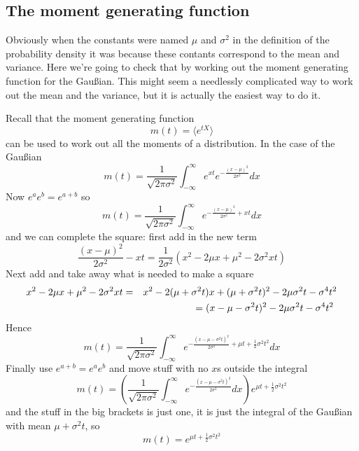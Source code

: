 \documentclass[11pt,a4paper]{scrartcl}
\begin{document}
\subsection*{The moment generating function}

Obviously when the constants were named $\mu$ and $\sigma^2$ in the
definition of the probability density it was because these contants
correspond to the mean and variance. Here we're going to check that by
working out the moment generating function for the Gau\ss{}ian. This
might seem a needlessly complicated way to work out the mean and the
variance, but it is actually the easiest way to do it.

Recall that the moment generating function 
\begin{equation}
m(t)=\langle e^{tX}\rangle
\end{equation}
can be used to work out all the moments of a distribution. In the case of the Gau\ss{}ian
\begin{equation}
m(t)=\frac{1}{\sqrt{2\pi\sigma^2}}\int_{-\infty}^\infty e^{xt}e^{-\frac{(x-\mu)^2}{2\sigma^2}}dx
\end{equation}
Now $e^ae^b=e^{a+b}$ so
\begin{equation}
m(t)=\frac{1}{\sqrt{2\pi\sigma^2}}\int_{-\infty}^\infty e^{-\frac{(x-\mu)^2}{2\sigma^2}+xt}dx
\end{equation}
and we can complete the square: first add in the new term
\begin{equation}
\frac{(x-\mu)^2}{2\sigma^2}-xt=\frac{1}{2\sigma^2}(x^2-2\mu x +\mu^2-2\sigma^2 xt)
\end{equation}
Next add and take away what is needed to make a square
\begin{eqnarray}
x^2-2\mu x +\mu^2-2\sigma^2 xt &=& x^2-2(\mu+\sigma^2 t) x +(\mu+\sigma^2 t)^2 - 2\mu\sigma^2 t -\sigma^4 t^2\cr
                                &&= (x-\mu-\sigma^2 t)^2 - 2\mu\sigma^2 t -\sigma^4 t^2\
\end{eqnarray}
Hence
\begin{equation}
m(t)=\frac{1}{\sqrt{2\pi\sigma^2}}\int_{-\infty}^\infty e^{-\frac{(x-\mu-\sigma^2 t)^2}{2\sigma^2}+\mu t + \frac{1}{2}\sigma^2 t^2}dx
\end{equation}     
Finally use $e^{a+b}=e^ae^b$ and move stuff with no $x$s outside the integral
 \begin{equation}
m(t)=\left(\frac{1}{\sqrt{2\pi\sigma^2}}\int_{-\infty}^\infty e^{-\frac{(x-\mu-\sigma^2 t)^2}{2\sigma^2}}dx\right) e^{\mu t + \frac{1}{2}\sigma^2 t^2}
\end{equation}
and the stuff in the big brackets is just one, it is just the integral of the Gau\ss{}ian with mean $\mu+\sigma^2 t$, so
\begin{equation}
m(t)= e^{\mu t + \frac{1}{2}\sigma^2 t^2}
\end{equation}
\end{document}
